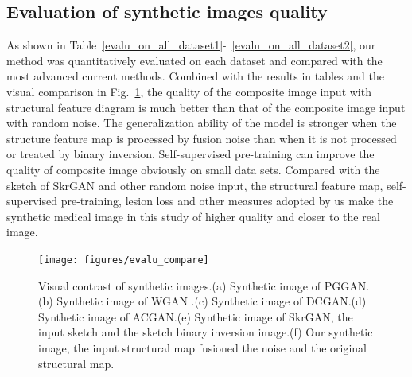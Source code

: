 \documentclass[runningheads]{llncs}
\begin{document}
	\subsection{Evaluation of synthetic images quality }
	As shown in Table~\ref{evalu_on_all_dataset1}-~\ref{evalu_on_all_dataset2}, our method was quantitatively evaluated on each dataset and compared with the most advanced current methods. Combined with the results in tables and the visual comparison in Fig.~\ref{evalu_compare}, the quality of the composite image input with structural feature diagram is much better than that of the composite image input with random noise. The generalization ability of the model is stronger when the structure feature map is processed by fusion noise than when it is not processed or treated by binary inversion. Self-supervised pre-training can improve the quality of composite image obviously on small data sets. Compared with the sketch of SkrGAN and other random noise input, the structural feature map, self-supervised pre-training, lesion loss and other measures adopted by us make the synthetic medical image in this study of higher quality and closer to the real image.
	\begin{figure}
		\centering
		\texttt{[image: figures/evalu\_compare]}
		\caption{Visual contrast of synthetic images.(a) Synthetic image of PGGAN\cite{100karras2017progressive,96zhang2019skrgan:}.(b) Synthetic image of WGAN \cite{99arjovsky2017wasserstein,96zhang2019skrgan:}.(c) Synthetic image of DCGAN\cite{97radford2015unsupervised,96zhang2019skrgan:}.(d) Synthetic image of ACGAN\cite{98odena2016conditional,96zhang2019skrgan:}.(e) Synthetic image of SkrGAN\cite{96zhang2019skrgan:}, the input sketch and the sketch binary inversion image.(f) Our synthetic image, the input structural map fusioned the noise and the original structural map.}
		\label{evalu_compare}
	\end{figure}
\end{document}
